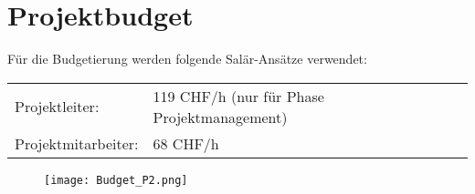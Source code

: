 \renewcommand{\arraystretch}{1.2}
\section{Projektbudget}
Für die Budgetierung werden folgende Salär-Ansätze verwendet: 
\begin{table}[H]
\begin{tabular}{ll}
Projektleiter:      & 119 CHF/h (nur für Phase Projektmanagement) \\
Projektmitarbeiter: & 68 CHF/h                                   
\end{tabular}
\end{table}

\begin{figure}[H]
	\centering
	\texttt{[image: Budget\_P2.png]}
	\label{fig:Budget}
\end{figure}